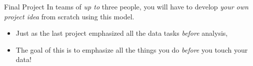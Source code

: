\documentclass[11pt]{beamer}
\begin{document}
\begin{frame}[c]{Final Project}
  In teams of \emph{up to} three people, \pause you will have to develop \emph{your own project idea} from scratch using this model.
  \begin{itemize}
    \item Just as the last project emphasized all the data tasks \emph{before} analysis,
    \pause \item The goal of this is to emphasize all the things you do \emph{before} you touch your data!
  \end{itemize}
\end{frame}
\end{document}
